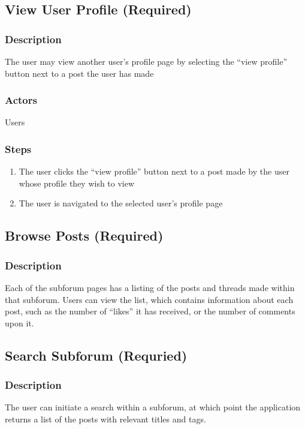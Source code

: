 \documentclass[12pt]{scrartcl}
\begin{document}
\subsection{View User Profile (Required)}
\subsubsection{Description}

The user may view another user’s profile page by selecting the “view profile” button next to a post the user has made

\subsubsection{Actors}

Users

\subsubsection{Steps}

\begin{enumerate}
\item The user clicks the “view profile” button next to a post made by the user whose profile they wish to view
\item The user is navigated to the selected user’s profile page
\end{enumerate}

\subsection{Browse Posts (Required)}
\subsubsection{Description}
Each of the subforum pages has a listing of the posts and threads made within that subforum. Users can view the list, which contains
information about each post, such as the number of “likes” it has received, or the number of comments upon it.

\subsection{Search Subforum (Requried)}
\subsubsection{Description}
The user can initiate a search within a subforum, at which point the application returns a list of the posts with relevant titles and tags.
\end{document}
